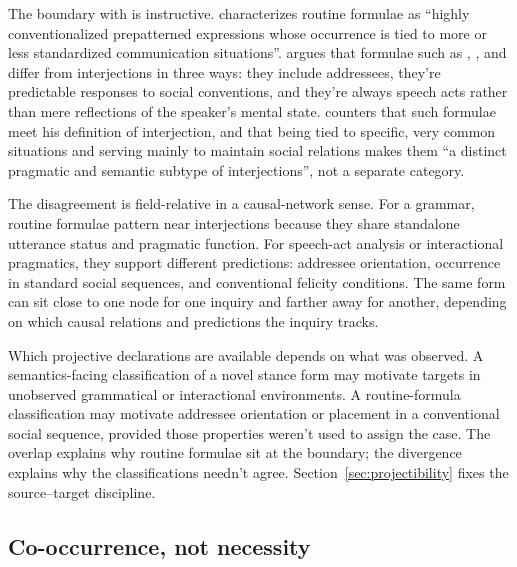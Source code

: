 \documentclass[12pt]{article}
\begin{document}
The boundary with  is instructive.
\textcite[2--3]{coulmas1981} characterizes routine formulae as
\enquote{highly conventionalized prepatterned expressions whose occurrence
is tied to more or less standardized communication situations}.
\textcite[108--110]{ameka1992} argues that formulae such as ,
, and  differ from interjections in three
ways: they include addressees, they're predictable responses to social
conventions, and they're always speech acts rather than mere reflections of
the speaker's mental state. \textcite[142]{wilkins1992} counters that such
formulae meet his definition of interjection, and that being tied to
specific, very common situations and serving mainly to maintain social
relations makes them \enquote{a distinct pragmatic and semantic subtype of
interjections}, not a separate category.

The disagreement is field-relative in a causal-network sense. For a
grammar, routine formulae pattern near interjections because they share
standalone utterance status and pragmatic function. For speech-act analysis or
interactional pragmatics, they support different predictions: addressee
orientation, occurrence in standard social sequences, and conventional
felicity conditions. The same form can sit close to one node
for one inquiry and farther away for another, depending on which causal
relations and predictions the inquiry tracks.

Which projective declarations are available depends on what was observed. A
semantics-facing classification of a novel stance form may motivate targets in
unobserved grammatical or interactional environments. A routine-formula
classification may motivate addressee orientation or placement in a
conventional social sequence, provided those properties weren't used to
assign the case. The overlap explains why routine formulae sit at the
boundary; the divergence explains why the classifications needn't agree.
Section~\ref{sec:projectibility} fixes the source--target discipline.

\subsection{Co-occurrence, not necessity}\label{sec:cooccurrence}
\end{document}
